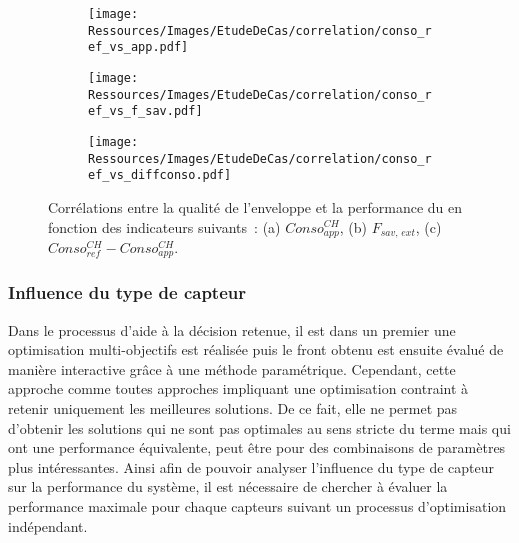 \begin{figure}
    \centering
    \begin{subfigure}[b]{0.31\textwidth}
        \centering
        \texttt{[image: Ressources/Images/EtudeDeCas/correlation/conso\_ref\_vs\_app.pdf]}
        \caption{}
        \label{fig:conso_ref_vs_app}
    \end{subfigure}
    \quad
    \begin{subfigure}[b]{0.31\textwidth}
        \centering
        \texttt{[image: Ressources/Images/EtudeDeCas/correlation/conso\_ref\_vs\_f\_sav.pdf]}
        \caption{}
        \label{fig:conso_ref_vs_f_sav}
    \end{subfigure}
    \quad
    \begin{subfigure}[b]{0.31\textwidth}
        \centering
        \texttt{[image: Ressources/Images/EtudeDeCas/correlation/conso\_ref\_vs\_diffconso.pdf]}
        \caption{}
        \label{fig:conso_ref_vs_diffconso}
    \end{subfigure}
    \caption[Corrélation entre la qualité de l’enveloppe et la performance du ]
             {Corrélations entre la qualité de l’enveloppe et la performance du 
              en fonction des indicateurs suivants~: (a) $Conso_{app}^{CH}$, (b) $F_{sav,\, ext}$,
              (c) $Conso_{ref}^{CH} - Conso_{app}^{CH}$.}
    \label{fig:conso_ref_vs_app_f_sav}
\end{figure}


\subsubsection{Influence du type de capteur} %
\label{ssub:influence_du_type_de_capteur}
Dans le processus d’aide à la décision retenue, il est dans un premier
une optimisation multi-objectifs est réalisée puis le front obtenu est ensuite
évalué de manière interactive grâce à une méthode paramétrique. Cependant,
cette approche comme toutes approches impliquant une optimisation contraint à retenir
uniquement les meilleures solutions. De ce fait, elle ne permet pas d’obtenir les
solutions qui ne sont pas optimales au sens stricte du terme mais qui ont une
performance équivalente, peut être pour des combinaisons de paramètres plus intéressantes.
Ainsi afin de pouvoir analyser l’influence du type de capteur sur la performance du système,
il est nécessaire de chercher à évaluer la performance maximale pour chaque
capteurs suivant un processus d’optimisation indépendant.

